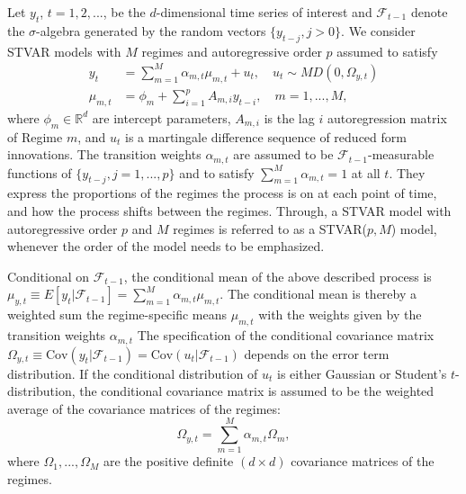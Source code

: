 \documentclass[nojss]{jss}
\begin{document}
Let $y_t$, $t=1,2,...$, be the $d$-dimensional time series of interest and $\mathcal{F}_{t-1}$ denote the $\sigma$-algebra generated by the random vectors $\lbrace y_{t-j}, j>0 \rbrace$. We consider STVAR models with $M$ regimes and autoregressive order $p$ assumed to satisfy
\begin{align}
y_t &=\sum_{m=1}^M \alpha_{m,t}\mu_{m,t} + u_t, \quad u_{t} \sim MD(0, \Omega_{y,t})\label{eq:stvar1} \\
\mu_{m,t} &= \phi_m + \sum_{i=1}^{p}A_{m,i}y_{t-i}, \quad m=1,...,M,\label{eq:stvar2}
\end{align}
where $\phi_m\in\mathbb{R}^{d}$ are intercept parameters, $A_{m,i}$ is the lag $i$ autoregression matrix of Regime $m$, and $u_t$ is a martingale difference sequence of reduced form innovations. The transition weights $\alpha_{m,t}$ are assumed to be $\mathcal{F}_{t-1}$-measurable functions of $\lbrace y_{t-j}, j=1,...,p \rbrace$ and to satisfy $\sum_{m=1}^{M}\alpha_{m,t}=1$ at all $t$. They express the proportions of the regimes the process is on at each point of time, and how the process shifts between the regimes. Through, a STVAR model with autoregressive order $p$ and $M$ regimes is referred to as a STVAR($p,M$) model, whenever the order of the model needs to be emphasized.

Conditional on $\mathcal{F}_{t-1}$, the conditional mean of the above described process is $\mu_{y,t} \equiv E[y_t|\mathcal{F}_{t-1}] = \sum_{m=1}^M \alpha_{m,t}\mu_{m,t}$. The conditional mean is thereby a weighted sum the regime-specific means $\mu_{m,t}$ with the weights given by the transition weights $\alpha_{m,t}$ The specification of the conditional covariance matrix $\Omega_{y,t}\equiv \text{Cov}(y_t|\mathcal{F}_{t-1})=\text{Cov}(u_t|\mathcal{F}_{t-1})$ depends on the error term distribution. If the conditional distribution of $u_{t}$ is either Gaussian or Student's $t$-distribution, the conditional covariance matrix is assumed to be the weighted average of the covariance matrices of the regimes:
\begin{equation}\label{eq:Omega_yt}
\Omega_{y,t} = \sum_{m=1}^M \alpha_{m,t}\Omega_m,
\end{equation}
where $\Omega_1,...,\Omega_M$ are the positive definite $(d\times d)$ covariance matrices of the regimes.
\end{document}
